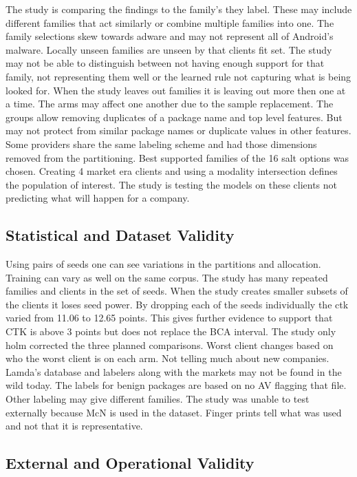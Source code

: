 \documentclass[12pt,letterpaper]{article}
\begin{document}
The study is comparing the findings to the family's they label. These may include different families that act similarly or combine multiple families into one. The family selections skew towards adware and may not represent all of Android's malware. Locally unseen families are unseen by that clients fit set. The study may not be able to distinguish between not having enough support for that family, not representing them well or the learned rule not capturing what is being looked for. When the study leaves out families it is leaving out more then one at a time. The arms may affect one another due to the sample replacement. The groups allow removing duplicates of a package name and top level features. But may not protect from similar package names or duplicate values in other features. Some providers share the same labeling scheme and had those dimensions removed from the partitioning. Best supported families of the 16 salt options was chosen. Creating 4 market era clients and using a modality intersection defines the population of interest. The study is testing the models on these clients not predicting what will happen for a company.

\subsection*{Statistical and Dataset Validity} 

Using pairs of seeds one can see variations in the partitions and allocation. Training can vary as well on the same corpus. The study has many repeated families and clients in the set of seeds. When the study creates smaller subsets of the clients it loses seed power. By dropping each of the seeds individually the ctk varied from 11.06 to 12.65 points. This gives further evidence to support that CTK is above 3 points but does not replace the BCA interval. The study only holm corrected the three planned comparisons. Worst client changes based on who the worst client is on each arm. Not telling much about new companies. Lamda's database and labelers along with the markets may not be found in the wild today. The labels for benign packages are based on no AV flagging that file. Other labeling may give different families. The study was unable to test externally because McN is used in the dataset. Finger prints tell what was used and not that it is representative.

\subsection*{External and Operational Validity} 
\end{document}
